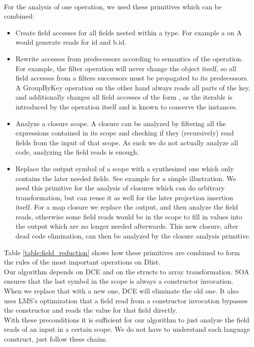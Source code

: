\\
For the analysis of one operation, we used these primitives which can be combined:
\begin{itemize}
\item Create field accesses for all fields nested within a type. For example a  on A would generate reads for id and b.id. 
\item Rewrite accesses from predecessors according to semantics of the operation. For example, the filter operation will never change the object itself, so all field accesses from a filters successors must be propagated to its predecessors. A GroupByKey operation on the other hand always reads all parts of the key, and additionally changes all field accesses of the form , as the iterable is introduced by the operation itself and is known to conserve the instances.
\item Analyze a closure scope. A closure can be analyzed by filtering all the expressions contained in its scope and checking if they (recursively) read fields from the input of that scope. As such we do not actually analyze all code, analyzing the field reads is enough. 
\item Replace the output symbol of a scope with a synthesized one which only contains the later needed fields. See example  for a simple illustration. We need this primitive for the analysis of closures which can do arbitrary transformation, but can reuse it as well for the later projection insertion itself. For a map closure we replace the output, and then analyze the field reads, otherwise some field reads would be in the scope to fill in values into the output which are no longer needed afterwards. This new closure, after dead code elimination, can then be analyzed by the closure analysis primitive.
\end{itemize}
Table \ref{table:field_reduction} shows how these primitives are combined to form the rules of the most important operations on Dlist.\\

Our algorithm depends on DCE and on the structs to array transformation. SOA ensures that the last symbol in the scope is always a constructor invocation. When we replace that with a new one, DCE will eliminate the old one. It also uses LMS's optimization that a field read from a constructor invocation bypasses the constructor and reads the value for that field directly.\\
With these preconditions it is sufficient for our algorithm to just analyze the field reads of an input in a certain scope. We do not have to understand each language construct, just follow these chains.

